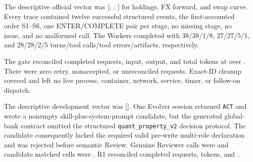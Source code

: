  The descriptive official vector was
[\PrimitiveProtocolGateHoldings{}; \PrimitiveProtocolGateFX{};
\PrimitiveProtocolGateSwap{}] for holdings, FX forward, and swap curve. Every
trace contained twelve successful structured events, the first-accounted order
S1--S6, one ENTER/COMPLETE pair per stage, no missing stage, no issue, and no
malformed call. The Workers completed with 38/38/1/8,
27/27/5/1, and 28/28/2/5 turns/tool calls/tool errors/artifacts, respectively.

The gate reconciled \PrimitiveProtocolGateRequests{} completed requests,
\PrimitiveProtocolGateInputTokens{} input,
\PrimitiveProtocolGateOutputTokens{} output, and
\PrimitiveProtocolGateTokens{} total tokens at
\PrimitiveProtocolGateCost{} over \PrimitiveProtocolGateWall{}. There were
zero retry, nonaccepted, or unreconciled requests. Exact-ID cleanup covered
\PrimitiveProtocolGateCleanup{} and left no live process, container, network,
service, timer, or follow-on dispatch.


The descriptive development vector was [\MiniROneHZeroVector{}]. One Evolver
session returned \texttt{ACT} and wrote a nonempty skill-plus-system-prompt
candidate, but the generated global-bank contract omitted the structured
\texttt{quant\_property\_v2} decision protocol. The candidate consequently
lacked the required valid pre-write multi-role declaration and was rejected
before semantic Review. Genuine Reviewer calls were
\MiniROneReviewerCalls{} and candidate matched cells were
\MiniROneCandidateCells{}. R1 reconciled \MiniROneRequests{} completed
requests, \MiniROneTokens{} tokens, and \MiniROneCost{}.

